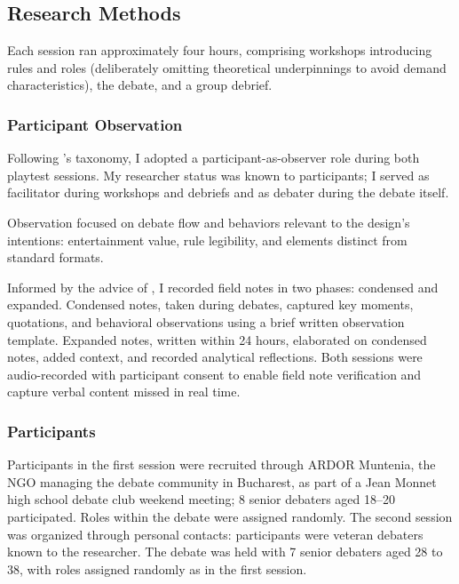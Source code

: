 \subsection{Research Methods}

Each session ran approximately four hours, comprising workshops introducing rules and roles (deliberately omitting theoretical underpinnings to avoid demand characteristics), the debate, and a group debrief.

\subsubsection{Participant Observation}

Following \textcite{baker2006observation}'s taxonomy, I adopted a participant-as-observer role during both playtest sessions. My researcher status was known to participants; I served as facilitator during workshops and debriefs and as debater during the debate itself.

Observation focused on debate flow and behaviors relevant to the design's intentions: entertainment value, rule legibility, and elements distinct from standard formats.

Informed by the advice of \textcite{spradley1980participant}, I recorded field notes in two phases: condensed and expanded. Condensed notes, taken during debates, captured key moments, quotations, and behavioral observations using a brief written observation template. Expanded notes, written within 24 hours, elaborated on condensed notes, added context, and recorded analytical reflections. Both sessions were audio-recorded with participant consent to enable field note verification and capture verbal content missed in real time.

\subsubsection{Participants}

Participants in the first session were recruited through ARDOR Muntenia, the NGO managing the debate community in Bucharest, as part of a Jean Monnet high school debate club weekend meeting; 8 senior debaters aged 18--20 participated. Roles within the debate were assigned randomly. The second session was organized through personal contacts: participants were veteran debaters known to the researcher. The debate was held with 7 senior debaters aged 28 to 38, with roles assigned randomly as in the first session.

